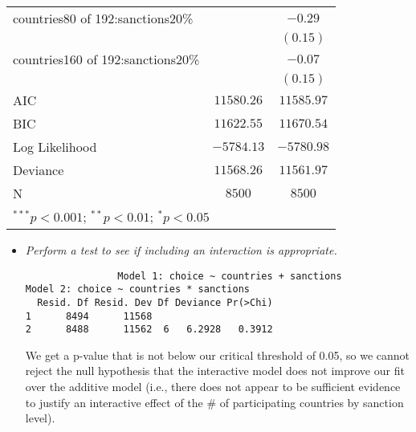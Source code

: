\documentclass[12pt,letterpaper]{article}
\begin{document}
\begin{enumerate}
\begin{enumerate}
\begin{table}[h!]
\begin{adjustbox}{width=.475\textwidth}
\begin{tabular}{l c c}
countries80 of 192:sanctions20\%  &               & $-0.29$       \\
                                  &               & $(0.15)$      \\
countries160 of 192:sanctions20\% &               & $-0.07$       \\
                                  &               & $(0.15)$      \\
\hline
AIC                               & $11580.26$    & $11585.97$    \\
BIC                               & $11622.55$    & $11670.54$    \\
Log Likelihood                    & $-5784.13$    & $-5780.98$    \\
Deviance                          & $11568.26$    & $11561.97$    \\
N                        & $8500$        & $8500$        \\
\hline
\multicolumn{3}{l}{\scriptsize{$^{***}p<0.001$; $^{**}p<0.01$; $^{*}p<0.05$}}
\end{tabular}
	\end{adjustbox}

\end{table}
		
	
		\begin{itemize}
			\item \textit{Perform a test to see if including an interaction is appropriate.}
			
			 
			
			\begin{verbatim}
				Model 1: choice ~ countries + sanctions
Model 2: choice ~ countries * sanctions
  Resid. Df Resid. Dev Df Deviance Pr(>Chi)
1      8494      11568                     
2      8488      11562  6   6.2928   0.3912
			\end{verbatim}
			We get a p-value that is not below our critical threshold of 0.05, so we cannot reject the null hypothesis that the interactive model does not improve our fit over the additive model (i.e., there does not appear to be sufficient evidence to justify an interactive effect of the \# of participating countries by sanction level).
			
		\end{itemize}
	\end{enumerate}
\end{enumerate}
\end{document}

